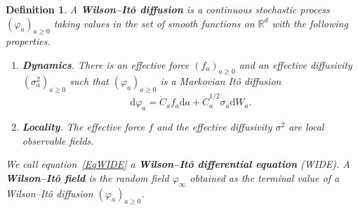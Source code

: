 \documentclass[reprint,aps]{revtex4-2}
\newcommand{\mathd}{\mathrm{d}}
\newcommand{\tmtextbf}[1]{\textbf{{{#1}}}}
\newcommand{\tmtextit}[1]{\textit{{{#1}}}}
\newenvironment{enumeratealpha}{\begin{enumerate}[a{\textup{)}}] }{\end{enumerate}}
\newtheorem{definition}{Definition}
\begin{document}
\begin{definition}
  \label{DefnLocalEQFT}A \tmtextbf{Wilson--It{\^o} diffusion} is a continuous
  stochastic process $(\varphi_a)_{a \geqslant 0}$ taking values in the set of
  smooth functions on $\mathbb{R}^d$ with the following properties.
  \begin{enumeratealpha}
    \item \tmtextbf{Dynamics}. There is an \tmtextit{effective force}
    $(f_a)_{a \geqslant 0}$ and \tmtextit{an effective diffusivity}
    $(\sigma_a^2)_{a \geqslant 0}$ such that $(\varphi_a)_{a \geqslant 0}$ is
    a Markovian It{\^o} diffusion
    \begin{equation}
      \label{EqWIDE} \mathd \varphi_a = \dot{C}_a f_a \mathd a + \dot{C}_a^{1
      / 2} \sigma_a \mathd W_a .
    \end{equation}
    \item \tmtextbf{Locality}. The effective force $f$ and the effective
    diffusivity $\sigma^2$ are local observable fields.
  \end{enumeratealpha}
  We call equation~\eqref{EqWIDE} a \tmtextbf{Wilson--It{\^o} differential
  equation} (WIDE). A \tmtextbf{Wilson--It{\^o} field} is the random field
  $\varphi_{\infty}$ obtained as the terminal value of a Wilson--It{\^o}
  diffusion $(\varphi_a)_{a \geqslant 0}$.
\end{definition}
\end{document}

